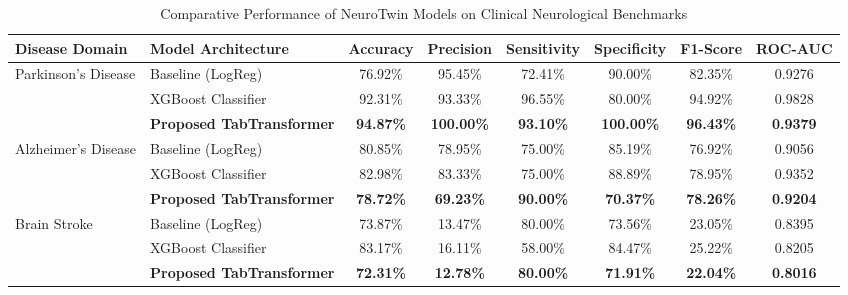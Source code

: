 \begin{table}[htbp]
\caption{Comparative Performance of NeuroTwin Models on Clinical Neurological Benchmarks}
\label{tab:neurotwin_results}
\centering
\small
\begin{tabular}{llcccccc}
\hline
\textbf{Disease Domain} & \textbf{Model Architecture} & \textbf{Accuracy} & \textbf{Precision} & \textbf{Sensitivity} & \textbf{Specificity} & \textbf{F1-Score} & \textbf{ROC-AUC} \\
\hline
Parkinson's Disease & Baseline (LogReg) & 76.92\% & 95.45\% & 72.41\% & 90.00\% & 82.35\% & 0.9276 \\
 & XGBoost Classifier & 92.31\% & 93.33\% & 96.55\% & 80.00\% & 94.92\% & 0.9828 \\
 & \textbf{Proposed TabTransformer} & \textbf{94.87\%} & \textbf{100.00\%} & \textbf{93.10\%} & \textbf{100.00\%} & \textbf{96.43\%} & \textbf{0.9379} \\
\hline
Alzheimer's Disease & Baseline (LogReg) & 80.85\% & 78.95\% & 75.00\% & 85.19\% & 76.92\% & 0.9056 \\
 & XGBoost Classifier & 82.98\% & 83.33\% & 75.00\% & 88.89\% & 78.95\% & 0.9352 \\
 & \textbf{Proposed TabTransformer} & \textbf{78.72\%} & \textbf{69.23\%} & \textbf{90.00\%} & \textbf{70.37\%} & \textbf{78.26\%} & \textbf{0.9204} \\
\hline
Brain Stroke & Baseline (LogReg) & 73.87\% & 13.47\% & 80.00\% & 73.56\% & 23.05\% & 0.8395 \\
 & XGBoost Classifier & 83.17\% & 16.11\% & 58.00\% & 84.47\% & 25.22\% & 0.8205 \\
 & \textbf{Proposed TabTransformer} & \textbf{72.31\%} & \textbf{12.78\%} & \textbf{80.00\%} & \textbf{71.91\%} & \textbf{22.04\%} & \textbf{0.8016} \\
\hline
\end{tabular}
\end{table}